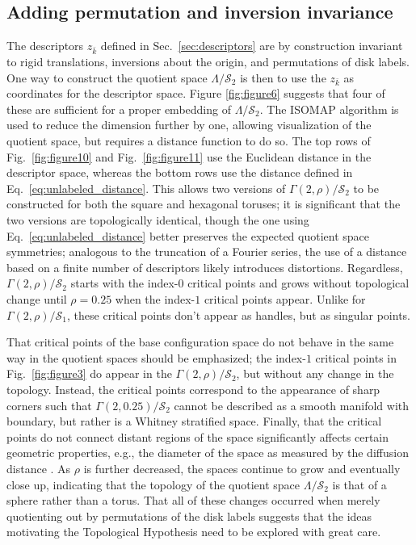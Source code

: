 \documentclass[default,iicol]{sn-jnl}%
\theoremstyle{thmstyleone}%
\theoremstyle{thmstyletwo}%
\theoremstyle{thmstylethree}%
\renewcommand{\vec}[1]{\bar{#1}}
\begin{document}
\subsection{Adding permutation and inversion invariance}
\label{subsec:space_translation_permutation_inversion}

The descriptors $z_{\vec{k}}$ defined in Sec.\ \ref{sec:descriptors} are by construction invariant to rigid translations, inversions about the origin, and permutations of disk labels. One way to construct the quotient space $\Lambda / \mathcal{S}_2$ is then to use the $z_{\vec{k}}$ as coordinates for the descriptor space. Figure \ref{fig:figure6} suggests that four of these are sufficient for a proper embedding of $\Lambda / \mathcal{S}_2$. The ISOMAP algorithm is used to reduce the dimension further by one, allowing visualization of the quotient space, but requires a distance function to do so. The top rows of Fig.\ \ref{fig:figure10} and Fig.\ \ref{fig:figure11} use the Euclidean distance in the descriptor space, whereas the bottom rows use the distance defined in Eq.\ \ref{eq:unlabeled_distance}. This allows two versions of $\Gamma(2, \rho) / \mathcal{S}_2$ to be constructed for both the square and hexagonal toruses; it is significant that the two versions are topologically identical, though the one using Eq.\ \ref{eq:unlabeled_distance} better preserves the expected quotient space symmetries; analogous to the truncation of a Fourier series, the use of a distance based on a finite number of descriptors likely introduces distortions. Regardless, $\Gamma(2, \rho) / \mathcal{S}_2$ starts with the index-$0$ critical points and grows without topological change until $\rho = 0.25$ when the index-$1$ critical points appear. Unlike for $\Gamma(2, \rho) / \mathcal{S}_1$, these critical points don't appear as handles, but as singular points. 

That critical points of the base configuration space do not behave in the same way in the quotient spaces should be emphasized; the index-$1$ critical points in Fig.\ \ref{fig:figure3} do appear in the $\Gamma(2, \rho) / \mathcal{S}_2$, but without any change in the topology. Instead, the critical points correspond to the appearance of sharp corners such that $\Gamma(2, 0.25) / \mathcal{S}_2$ cannot be described as a smooth manifold with boundary, but rather is a Whitney stratified space. Finally, that the critical points do not connect distant regions of the space significantly affects certain geometric properties, e.g., the diameter of the space as measured by the diffusion distance \cite{coifman2006diffusion}. As $\rho$ is further decreased, the spaces continue to grow and eventually close up, indicating that the topology of the quotient space $\Lambda / \mathcal{S}_2$ is that of a sphere rather than a torus. That all of these changes occurred when merely quotienting out by permutations of the disk labels suggests that the ideas motivating the Topological Hypothesis need to be explored with great care.
\end{document}
